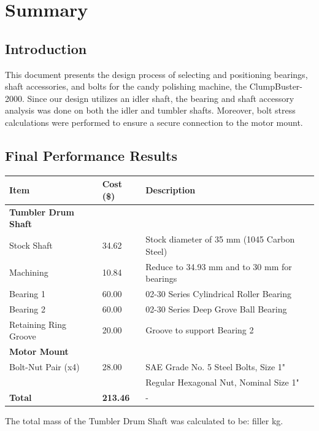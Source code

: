 \documentclass[letterpaper,12pt]{article}
\begin{document}
\section{Summary}

\subsection{Introduction}
This document presents the design process of selecting and positioning bearings, shaft accessories, and bolts for the candy polishing machine, the ClumpBuster-2000. Since our design utilizes an idler shaft, the bearing and shaft accessory analysis was done on both the idler and tumbler shafts. Moreover, bolt stress calculations were performed to ensure a secure connection to the motor mount.

\subsection{Final Performance Results}
\vspace{4mm}
\begin{center}
	\begin{tabular}{ |p{4cm}||p{2cm}|p{8cm}|  }
		\hline
		\textbf{Item} & \textbf{Cost (\$)} & \textbf{Description} \\
		\hline
		\hline
		\textbf{Tumbler Drum Shaft} & & \\
		Stock Shaft & 34.62 & Stock diameter of 35 mm (1045 Carbon Steel)\\
		Machining & 10.84 & Reduce to 34.93 mm and to 30 mm for bearings\\
		Bearing 1 & 60.00 & 02-30 Series Cylindrical Roller Bearing \\
		Bearing 2 & 60.00 & 02-30 Series Deep Grove Ball Bearing \\
		Retaining Ring Groove & 20.00 & Groove to support Bearing 2\\
		\hline
		\hline
		\textbf{Motor Mount} & & \\
		Bolt-Nut Pair (x4) & 28.00 & SAE Grade No. 5 Steel Bolts, Size 1" \\
		 & & Regular Hexagonal Nut, Nominal Size 1" \\
		\hline
		\hline
		\textbf{Total} & \textbf{213.46}& - \\
		\hline
	\end{tabular}
\end{center}
\noindent The total mass of the Tumbler Drum Shaft was calculated to be: filler kg.
\end{document}

